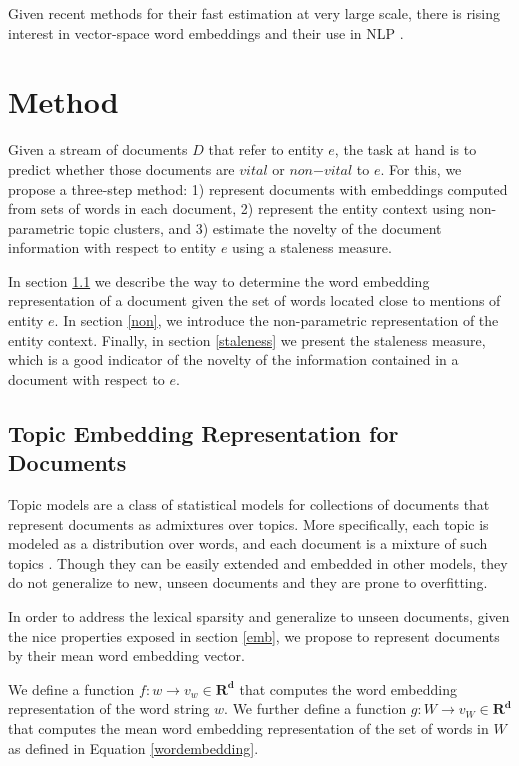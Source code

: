 \documentclass{article}
\begin{document}
Given recent methods for their fast estimation at very large scale, there is rising interest in vector-space word embeddings and their use in NLP \cite{Arvind14}.

\section{Method}
\label{approach}

Given a stream of documents $D$ that refer to entity $e$, the task at hand is to predict whether those documents are $vital$ or $non\mathord{-}vital$ to $e$. For this, we propose a three-step method: 1) represent documents with embeddings computed from sets of words in each document, 2) represent the entity context using non-parametric topic clusters, and 3) estimate the novelty of the document information with respect to entity $e$ using a staleness measure.

In section \ref{docwordemb} we describe the way to determine the word embedding representation of a document given the set of words located close to mentions of entity $e$. In section \ref{non}, we introduce the non-parametric representation of the entity context. Finally, in section \ref{staleness} we present the staleness measure, which is a good indicator of the novelty of the information contained in a document with respect to $e$.

\subsection{Topic Embedding Representation for Documents}
\label{docwordemb}

Topic models are a class of statistical models for collections of documents that represent documents as admixtures over topics. More specifically, each topic is modeled as a distribution over words, and each document is a mixture of such topics \cite{InouyeRD14}. Though they can be easily extended and embedded in other models, they do not generalize to new, unseen documents and they are prone to overfitting. 

In order to address the lexical sparsity and generalize to unseen documents, given the nice properties exposed in section \ref{emb}, we propose to represent documents by their mean word embedding vector.

We define a function $f : w \rightarrow v_w \in \mathbf{R^d}$ that computes the word embedding representation of the word string $w$. We further define a function $g : W \rightarrow v_W \in \mathbf{R^d}$ that computes the mean word embedding representation of the set of words in $W$ as defined in Equation \ref{wordembedding}.
\end{document}

